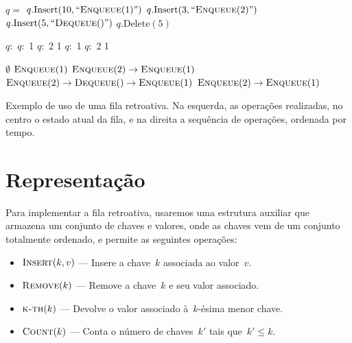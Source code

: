 \documentclass[main.tex]{subfiles}
\begin{document}
\begin{table}
\centering

\begin{subalgorithm}{0.34\textwidth}
\begin{algorithmic}

	\State $q =$ 
	\State $q.\text{Insert}(10, ``\Call{Enqueue}{1}")$
	\State $q.\text{Insert}(3, ``\Call{Enqueue}{2}")$
	\State $q.\text{Insert}(5, ``\Call{Dequeue}{\null}")$
	\State $q.\text{Delete}(5)$

\end{algorithmic}
\end{subalgorithm} \vrule
\begin{subalgorithm}{0.14\textwidth}
\begin{algorithmic}

	\State $q:$
	\State $q:$ 1
	\State $q:$ 2 1
	\State $q:$ 1
	\State $q:$ 2 1

\end{algorithmic}
\end{subalgorithm} \vrule
\begin{subalgorithm}{0.5\textwidth}
\begin{algorithmic}

	\State $\emptyset$
	\State $\Call{Enqueue}{1}$
	\State $\Call{Enqueue}{2} \rightarrow \Call{Enqueue}{1}$
	\State $\Call{Enqueue}{2} \rightarrow \Call{Dequeue}{\null} \rightarrow \Call{Enqueue}{1}$
	\State $\Call{Enqueue}{2} \rightarrow \Call{Enqueue}{1}$

\end{algorithmic}
\end{subalgorithm}
\caption{Exemplo de uso de uma fila retroativa. Na esquerda, as operações realizadas, no centro o estado atual da fila, e na direita a sequência de operações, ordenada por tempo.} \label{ex:fila_retro}
\end{table}

\section{Representação}

Para implementar a fila retroativa, usaremos uma estrutura auxiliar que armazena um conjunto de chaves e valores, onde as chaves vem de um conjunto totalmente ordenado, e permite as seguintes operações:

\begin{itemize}
	\item $\Call{Insert}{k, v}$ --- Insere a chave~$k$ associada ao valor~$v$.
	\item $\Call{Remove}{k}$ --- Remove a chave~$k$ e seu valor associado.
	\item $\Call{k-th}{k}$ --- Devolve o valor associado à~$k$-ésima menor chave. %
	\item $\Call{Count}{k}$ --- Conta o número de chaves~$k'$ tais que~$k' \leq k$.
\end{itemize}
\end{document}
